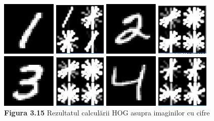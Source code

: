 \documentclass[a4paper,12pt]{report}
\begin{document}
\begin {center} 
	\begin {footnotesize} 
		\includegraphics[width = 26mm]{fig3_15_1} 
		\includegraphics[width = 25mm]{fig3_15_2} 
		\includegraphics[width = 26mm]{fig3_15_3} 
		\includegraphics[width = 25mm]{fig3_15_4} \\
		\includegraphics[width = 26mm]{fig3_15_5} 
		\includegraphics[width = 25mm]{fig3_15_6} 
		\includegraphics[width = 26mm]{fig3_15_7} 
		\includegraphics[width = 25mm]{fig3_15_8} \\
		\textbf  {Figura 3.15}  Rezultatul calculării HOG asupra imaginilor cu cifre
	\end {footnotesize} 
\end {center}
\end{document}
